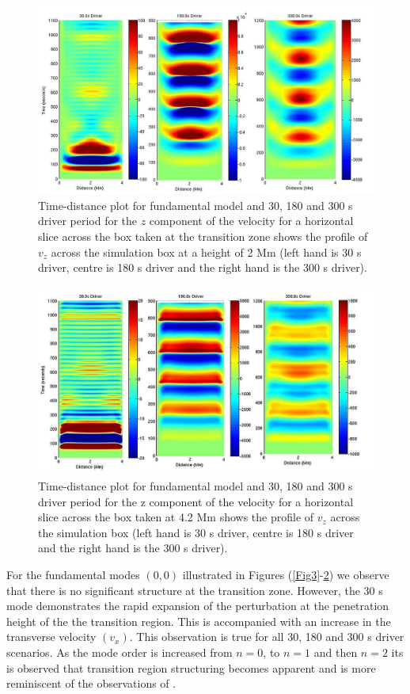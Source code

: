 \documentclass[preprint,authoryear,12pt]{elsarticle}
\begin{document}
\begin{figure}[h]
\includegraphics[scale=0.4]{imrescale/fig4_dt_30_180_300_0_horiz_2Mm.jpg}
\caption{Time-distance plot for fundamental model and 30, 180 and 300 s driver period for the $z$ component of the velocity for a horizontal slice across the box  taken at the transition zone shows  the profile of $v_{z}$ across the simulation box at a height of 2 Mm (left hand is 30 s driver, centre is 180 s driver and the right hand is the 300 s driver). }
\label{Fig5}
\end{figure}
\begin{figure}[h]
\includegraphics[scale=0.4]{imrescale/fig5_dt_30_180_300_0_horiz_4p2Mm.jpg}
\caption{Time-distance plot for fundamental model and 30, 180 and 300 s driver period for the z component of the velocity for a horizontal slice across the box  taken at 4.2 Mm shows  the profile of $v_{z}$ across the simulation box (left hand is 30 s driver, centre is 180 s driver and the right hand is the 300 s driver). }
\label{Fig6}
\end{figure}
For the fundamental modes $(0, 0)$  illustrated in Figures (\ref{Fig3}-\ref{Fig6})  we observe that there is no significant structure at the transition zone. However, the 30 s mode demonstrates the rapid expansion of the perturbation at the penetration height of the the transition region. This is accompanied with an increase in the transverse velocity $(v_x)$. This observation is true for all 30, 180 and 300 s driver scenarios. As the mode order is increased from $n=0$, to $n=1$ and then $n=2$ its is observed that transition region structuring becomes apparent and is more reminiscent of the observations of \citet{Malins2007A}.
\end{document}
